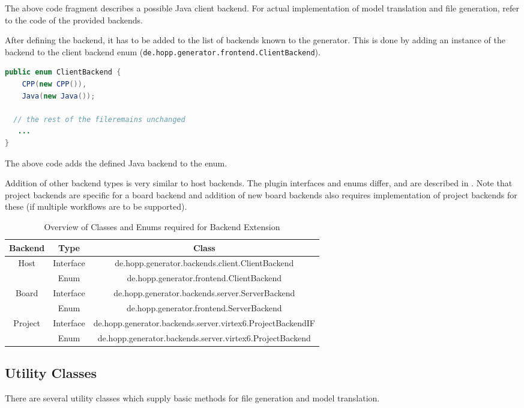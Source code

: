 \documentclass{report}
\begin{document}
The above code fragment describes a possible Java client backend. For actual implementation of model translation and file generation, refer to the code of the provided backends.

After defining the backend, it has to be added to the list of backends known to the generator. This is done by adding an instance of the backend to the client backend enum (\texttt{de.hopp.generator.frontend.ClientBackend}).

\begin{lstlisting}[language=java]
public enum ClientBackend {
    CPP(new CPP()),
    Java(new Java());

  // the rest of the fileremains unchanged
   ...
}
\end{lstlisting}

The above code adds the defined Java backend to the enum.

Addition of other backend types is very similar to host backends. The plugin interfaces and enums differ, and are described in
. Note that project backends are specific for a board backend and addition of new board backends also requires implementation of project backends for these (if multiple workflows are to be supported).

\begin{table}[h]
\centering
\begin{tabular}{ c | c | c }
Backend & Type & Class \\ \hline\hline
Host & Interface & de.hopp.generator.backends.client.ClientBackend \\
& Enum & de.hopp.generator.frontend.ClientBackend\\ \hline
Board & Interface & de.hopp.generator.backends.server.ServerBackend\\
& Enum & de.hopp.generator.frontend.ServerBackend\\ \hline
Project & Interface & de.hopp.generator.backends.server.virtex6.ProjectBackendIF\\
& Enum & de.hopp.generator.backends.server.virtex6.ProjectBackend\\
\end{tabular}
\caption{Overview of Classes and Enums required for Backend Extension}
\label{tab:gen:hook}
\end{table}


\subsection{Utility Classes}
There are several utility classes which supply basic methods for file generation and model translation.
\end{document}
